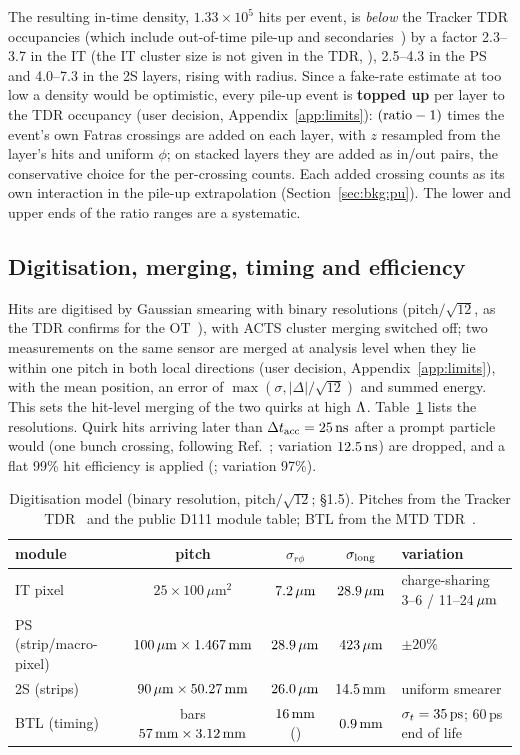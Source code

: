 The resulting in-time density, $1.33\times10^5$ hits per event, is \emph{below} the Tracker TDR occupancies (which
include out-of-time pile-up and secondaries~\cite[Sec.~6.2.1, Fig.~6.3]{CMS:2017lum}) by a factor 2.3--3.7 in the IT
(the IT cluster size is not given in the TDR, \EST{}), 2.5--4.3 in the PS and 4.0--7.3 in the 2S layers, rising with
radius. Since a fake-rate estimate at too low a density would be optimistic, every pile-up event is \textbf{topped up}
per layer to the TDR occupancy (user decision, Appendix~\ref{app:limits}): $({\rm ratio}-1)$ times the event's own Fatras crossings are added
on each layer, with $z$ resampled from the layer's hits and uniform $\phi$; on stacked layers they are added as in/out
pairs, the conservative choice for the per-crossing counts. Each added crossing counts as its own interaction in the
pile-up extrapolation (Section~\ref{sec:bkg:pu}). The lower and upper ends of the ratio ranges are a systematic.

\subsection{Digitisation, merging, timing and efficiency}\label{sec:detector:digi}
Hits are digitised by Gaussian smearing with binary resolutions (pitch$/\sqrt{12}$, as the TDR confirms for the
OT~\cite[Sec.~12.2]{CMS:2017lum}), with ACTS cluster merging switched off; two measurements on the same sensor are merged
at analysis level when they lie within one pitch in both local directions (user decision, Appendix~\ref{app:limits}), with the mean
position, an error of $\max(\sigma,|\Delta|/\sqrt{12})$ and summed energy. This sets the hit-level merging of the two
quirks at high $\Lambda$. Table~\ref{tab:digi} lists the resolutions. Quirk hits arriving later than $\Delta t_{\rm
acc}=25\,\mathrm{ns}$ after a prompt particle would (one bunch crossing, following Ref.~\cite[Sec.~IV]{Knapen:2017kly}; variation
$12.5\,\mathrm{ns}$) are dropped, and a flat 99\% hit efficiency is applied (\UNV{}; variation 97\%).

\begin{table}[htbp]
\centering
\caption{Digitisation model (binary resolution, pitch$/\sqrt{12}$;  \S1.5). Pitches from the Tracker
TDR~\cite{CMS:2017lum} and the public D111 module table; BTL from the MTD TDR~\cite{Butler:2019rpu}.}
\label{tab:digi}
\small
\begin{tabularx}{\linewidth}{lccc>{\raggedright\arraybackslash}X}
\toprule
module & pitch & $\sigma_{r\phi}$ & $\sigma_{\rm long}$ & variation\\
\midrule
IT pixel & $25\times100\,\mu$m$^2$ & $7.2\,\mu\mathrm{m}$ & $28.9\,\mu\mathrm{m}$ & charge-sharing 3--6 / 11--24$\,\mu\mathrm{m}$\\
PS (strip/macro-pixel) & $100\,\mu\mathrm{m}\times1.467\,\mathrm{mm}$ & $28.9\,\mu\mathrm{m}$ & $423\,\mu\mathrm{m}$ & $\pm20\%$\\
2S (strips) & $90\,\mu\mathrm{m}\times50.27\,\mathrm{mm}$ & $26.0\,\mu\mathrm{m}$ & $14.5\,\mathrm{mm}$ & uniform smearer\\
BTL (timing) & bars $57\,\mathrm{mm}\times3.12\,\mathrm{mm}$ & $16\,\mathrm{mm}$ (\EST{}) & $0.9\,\mathrm{mm}$ & $\sigma_t=35\,\mathrm{ps}$; 60\,ps end of life\\
\bottomrule
\end{tabularx}
\end{table}

